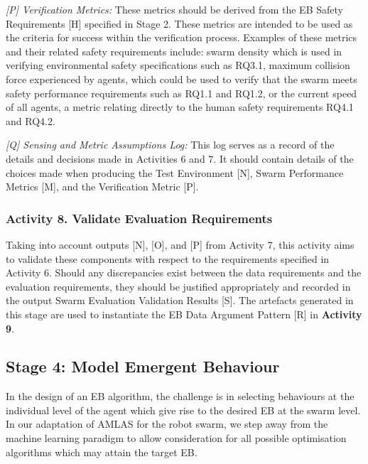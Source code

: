 \documentclass[runningheads]{llncs}
\begin{document}
\emph{[P] Verification Metrics:} These metrics should be derived from the EB Safety Requirements [H] specified in Stage 2. These metrics are intended to be used as the criteria for success within the verification process. Examples of these metrics and their related safety requirements include: swarm density which is used in verifying environmental safety specifications such as RQ3.1, maximum collision force experienced by agents, which could be used to verify that the swarm meets safety performance requirements such as RQ1.1 and RQ1.2, or the current speed of all agents, a metric relating directly to the human safety requirements RQ4.1 and RQ4.2.

\emph{[Q] Sensing and Metric Assumptions Log:} This log serves as a record of the details and decisions made in Activities 6 and 7. It should contain details of the choices made when producing the Test Environment [N], Swarm Performance Metrics [M], and the Verification Metric [P].
\subsubsection*{Activity 8. Validate Evaluation Requirements}

Taking into account outputs [N], [O], and [P] from Activity 7, this activity aims to validate these components with respect to the requirements specified in Activity 6. Should any discrepancies exist between the data requirements and the evaluation requirements, they should be justified appropriately and recorded in the output Swarm Evaluation Validation Results [S]. 
The artefacts generated in this stage are used to instantiate the EB Data Argument Pattern [R] in \textbf{Activity 9}.

\subsection{Stage 4: Model Emergent Behaviour} \label{framework-stage4}
In the design of an EB algorithm, the challenge is in selecting behaviours at the individual level of the agent which give rise to the desired EB at the swarm level. 
In our adaptation of AMLAS for the robot swarm,  we step away from the machine learning paradigm to allow consideration for all possible optimisation algorithms which may attain the target EB.
\end{document}
